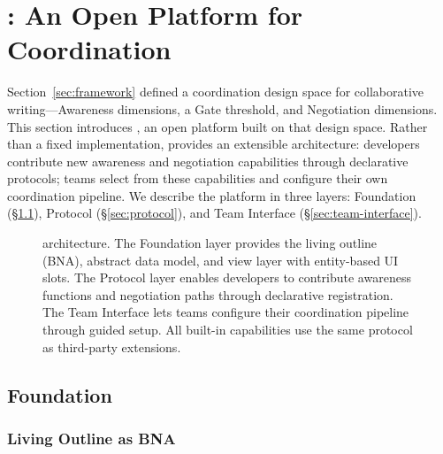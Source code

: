\section{\system{}: An Open Platform for Coordination}
\label{sec:system}

Section~\ref{sec:framework} defined a coordination design space for collaborative writing---Awareness dimensions, a Gate threshold, and Negotiation dimensions. This section introduces \system{}, an open platform built on that design space. Rather than a fixed implementation, \system{} provides an extensible architecture: developers contribute new awareness and negotiation capabilities through declarative protocols; teams select from these capabilities and configure their own coordination pipeline. We describe the platform in three layers: Foundation (\S\ref{sec:foundation}), Protocol (\S\ref{sec:protocol}), and Team Interface (\S\ref{sec:team-interface}).

\begin{figure}[t]
\centering
{}
\caption{\system{} architecture. The Foundation layer provides the living outline (BNA), abstract data model, and view layer with entity-based UI slots. The Protocol layer enables developers to contribute awareness functions and negotiation paths through declarative registration. The Team Interface lets teams configure their coordination pipeline through guided setup. All built-in capabilities use the same protocol as third-party extensions.}
\label{fig:architecture}
\end{figure}


\subsection{Foundation}
\label{sec:foundation}

\subsubsection{Living Outline as BNA}

